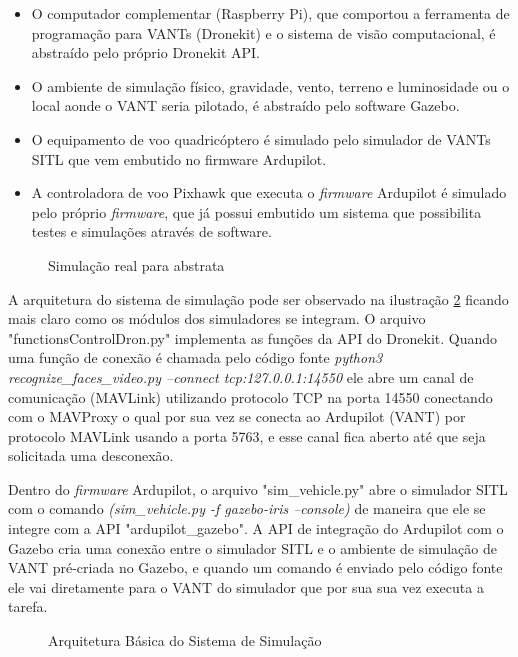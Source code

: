 \begin{itemize}
	\item O computador complementar (Raspberry Pi), que comportou a ferramenta de programação para VANTs (Dronekit) e o sistema de visão computacional, é abstraído pelo próprio Dronekit API.
	\item O ambiente de simulação físico, gravidade, vento, terreno e luminosidade ou o local aonde o VANT seria pilotado, é abstraído pelo software Gazebo. 
	\item O equipamento de voo quadricóptero é simulado pelo simulador de VANTs SITL que vem embutido no firmware Ardupilot.
	\item A controladora de voo Pixhawk que executa o \textit{firmware} Ardupilot é simulado pelo próprio \textit{firmware}, que já possui embutido um sistema que possibilita testes e simulações através de software.  
\end{itemize}  

\begin{figure}[H]
	\centering
	\caption{Simulação real para abstrata}
	\fontsize{9pt}{12pt}\selectfont
	\def\svgwidth{15cm}
	
	\label{fig:simul}
\end{figure}

A arquitetura do sistema de simulação pode ser observado na ilustração \ref{fig:arc} ficando mais claro como os módulos dos simuladores se integram. O arquivo "functionsControlDron.py"  implementa as funções da API do Dronekit. Quando uma função de conexão é chamada pelo código fonte \textit{python3 recognize\_faces\_video.py --connect tcp:127.0.0.1:14550} ele abre um canal de comunicação (MAVLink) utilizando protocolo TCP na porta 14550 conectando com o MAVProxy o qual por sua vez se conecta ao Ardupilot (VANT) por protocolo MAVLink usando a porta 5763, e esse canal fica aberto até que seja solicitada uma desconexão. 

Dentro do \textit{firmware} Ardupilot, o arquivo "sim\_vehicle.py" abre o simulador SITL com o comando \textit{(sim\_vehicle.py -f gazebo-iris --console)} de maneira que ele se integre com a API "ardupilot\_gazebo". A API de integração do Ardupilot com o Gazebo cria uma conexão entre o simulador SITL e o ambiente de simulação de VANT pré-criada no Gazebo, e quando um comando é enviado pelo código fonte ele vai diretamente para o VANT do simulador que por sua sua vez executa a tarefa. 

\begin{figure}[H]
	\centering
	\caption{Arquitetura Básica do Sistema de Simulação}
	\fontsize{9pt}{12pt}\selectfont
	\def\svgwidth{15cm}
	
	\label{fig:arc}
\end{figure}

